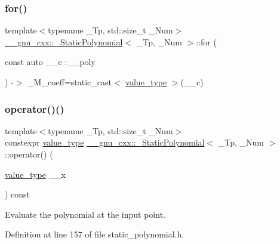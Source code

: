 \subsubsection{\texorpdfstring{for()}{for()}}
{\footnotesize\ttfamily template$<$typename \+\_\+\+Tp, std\+::size\+\_\+t \+\_\+\+Num$>$ \\
\hyperlink{class____gnu__cxx_1_1__StaticPolynomial}{\+\_\+\+\_\+gnu\+\_\+cxx\+::\+\_\+\+Static\+Polynomial}$<$ \+\_\+\+Tp, \+\_\+\+Num $>$\+::for (\begin{DoxyParamCaption}\item[{const auto \+\_\+\+\_\+c \+:\+\_\+\+\_\+poly}]{ }\end{DoxyParamCaption}) -\/$>$  \+\_\+\+M\+\_\+coeff=static\+\_\+cast$<$ \hyperlink{class____gnu__cxx_1_1__StaticPolynomial_af23110f5a002cd6caa3542df7cf35284}{value\+\_\+type} $>$(\+\_\+\+\_\+c)}

\mbox{\label{class____gnu__cxx_1_1__StaticPolynomial_a2316a417163742951f76e2272fc434f4}} 
\subsubsection{\texorpdfstring{operator()()}{operator()()}\hspace{0.1cm}{\footnotesize\ttfamily [1/4]}}
{\footnotesize\ttfamily template$<$typename \+\_\+\+Tp, std\+::size\+\_\+t \+\_\+\+Num$>$ \\
constexpr \hyperlink{class____gnu__cxx_1_1__StaticPolynomial_af23110f5a002cd6caa3542df7cf35284}{value\+\_\+type} \hyperlink{class____gnu__cxx_1_1__StaticPolynomial}{\+\_\+\+\_\+gnu\+\_\+cxx\+::\+\_\+\+Static\+Polynomial}$<$ \+\_\+\+Tp, \+\_\+\+Num $>$\+::operator() (\begin{DoxyParamCaption}\item[{\hyperlink{class____gnu__cxx_1_1__StaticPolynomial_af23110f5a002cd6caa3542df7cf35284}{value\+\_\+type}}]{\+\_\+\+\_\+x }\end{DoxyParamCaption}) const\hspace{0.3cm}{\ttfamily [inline]}}

Evaluate the polynomial at the input point. 

Definition at line 157 of file static\+\_\+polynomial.\+h.



